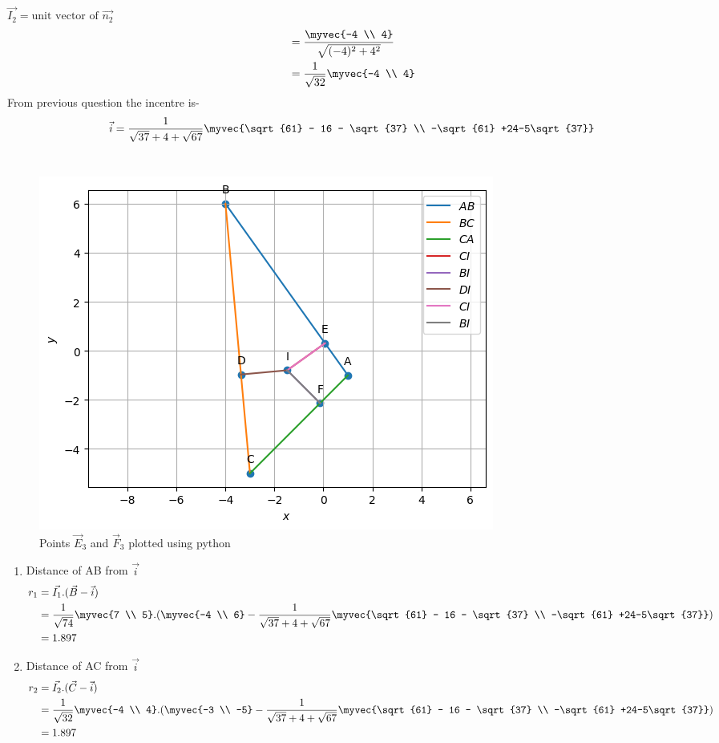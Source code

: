 \documentclass[journal,12pt,twocolumn]{IEEEtran}
\theoremstyle{remark}
\begin{document}
$\vec{I_2}= \text{unit vector of }\vec{n_2}$
\begin{align}
&= \frac{\myvec{-4 \\ 4}}{\sqrt{(-4)^2 + 4^2}}\\
&=\frac{1}{\sqrt{32}}\myvec{-4 \\ 4}
\end{align}
From previous question the incentre is-
\begin{align}
\vec{i} = \frac{1}{\sqrt{37} + 4 + \sqrt{67}}\myvec{\sqrt{61} - 16 - \sqrt{37} \\ -\sqrt{61} +24-5\sqrt{37}} 
\end{align}\\
\begin{figure}[H]
\includegraphics[width=\columnwidth]{codes/Incentre.png}
\caption{Points $\vec{E}_3$ and $\vec{F}_3$ plotted using python}
\label{fig:i_tri_py}
\end{figure}
\begin{enumerate}
\item
Distance of AB from $\vec{i}$
\begin{align}
r_1 &= \vec{I_1} . (\vec{B}-\vec{i})\\
&= \frac{1}{\sqrt{74}}\myvec{7 \\ 5} . (\myvec{-4 \\ 6} - \frac{1}{\sqrt{37} + 4 + \sqrt{67}}\myvec{\sqrt{61} - 16 - \sqrt{37} \\ -\sqrt{61} +24-5\sqrt{37}} )\\
&= 1.897
\end{align}
\item
Distance of AC from $\vec{i}$
\begin{align}
r_2 &= \vec{I_2} . (\vec{C}-\vec{i})\\
&= \frac{1}{\sqrt{32}}\myvec{-4 \\ 4} . (\myvec{-3 \\ -5} - \frac{1}{\sqrt{37} + 4 + \sqrt{67}}\myvec{\sqrt{61} - 16 - \sqrt{37} \\ -\sqrt{61} +24-5\sqrt{37}} )\\
&= 1.897
\end{align}
\end{enumerate}
\end{document}
